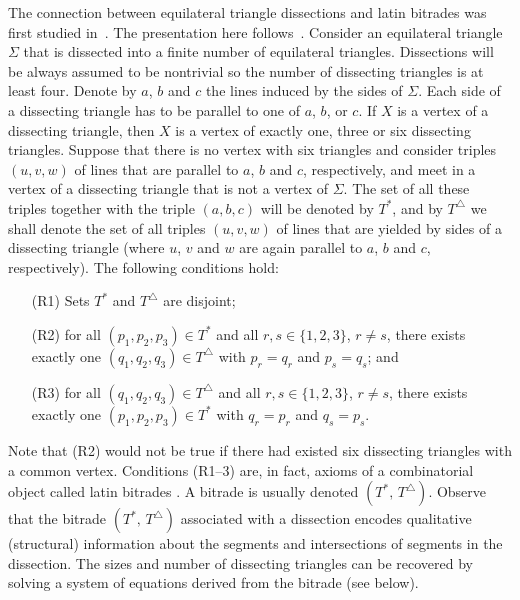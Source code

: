 \documentclass[12pt,amstags,fleqn]{article}
\theoremstyle{plain}
\theoremstyle{definition}
\def\ll{{\textstyle \ast}}
\def\rr{{\scriptscriptstyle \triangle}}
\newcommand{\opa}{\ll}
\newcommand{\opb}{\rr}
\begin{document}
The connection between equilateral triangle dissections and latin
bitrades was first studied in~\cite{aleshamming}. The presentation here
follows~\cite{alesdissections}.  
Consider an equilateral triangle $\Sigma$ that is dissected
into a finite number of equilateral triangles. 
Dissections will be always assumed to be nontrivial so the
number of dissecting triangles is at least four. 
Denote by $a$, $b$ and $c$
the lines induced by the sides of $\Sigma$.
Each side of a dissecting triangle has to be parallel
to one of $a$, $b$, or $c$. If $X$ is a vertex
of a dissecting triangle, then $X$ is a vertex of exactly one,
three or six dissecting triangles. Suppose that there is
no vertex with six triangles and consider triples 
$(u,v,w)$ of lines that are parallel to $a$, $b$ and $c$, respectively,
and meet in  a vertex of a dissecting triangle that is not a vertex
of $\Sigma$. The set of all these triples together with the triple
$(a,b,c)$ will be denoted by $T^\ll$, and by $T^\rr$ we shall
denote the set of all triples $(u,v,w)$ of lines that are yielded 
by sides of a dissecting triangle (where $u$, $v$ and $w$ are again parallel to
$a$, $b$ and $c$, respectively). The following conditions
hold:
\begin{enumerate}
\item[(R1)] Sets $T^\ll$ and $T^\rr$ are disjoint;
\item[(R2)] for all $(p_1,p_2,p_3)\in T^\ll$ and 
all $r,s \in \{1,2,3\}$, $r \ne s$, there exists exactly one
$(q_1,q_2,q_3) \in T^\rr$ with $p_r = q_r$ and $p_s = q_s$; and
\item[(R3)] for all $(q_1,q_2,q_3)\in T^\rr$ and
all $r,s \in \{1,2,3\}$, $r \ne s$, there exists exactly one
$(p_1,p_2,p_3) \in T^\ll$ with $q_r = p_r$ and $q_s = p_s$.
\end{enumerate}

Note that (R2) would not be true if there had existed six dissecting
triangles with a common vertex. Conditions (R1--3) are, in fact, axioms
of a combinatorial object called latin bitrades
\cite[p.~148]{wanlesshandbook}. A bitrade is usually denoted
$(T^{\opa},\, T^{\opb})$. Observe that the bitrade $(T^{\opa},\,
T^{\opb})$ associated with a dissection encodes
qualitative
(structural) information about the segments and intersections of
segments in the dissection. The sizes and number of dissecting triangles
can be recovered by solving a system of equations derived from 
the bitrade (see below).
\end{document}

